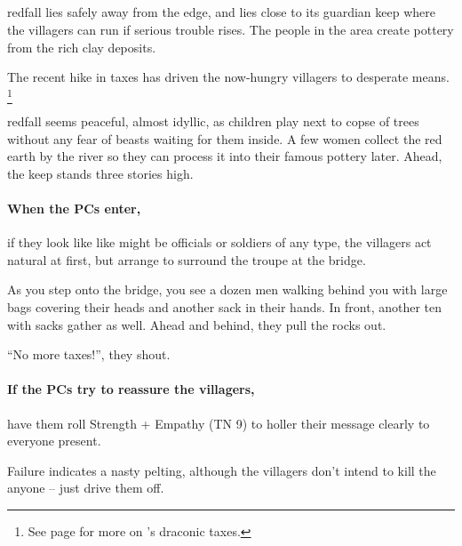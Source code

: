 
\subsection{}
\label{redfallVillage}

\Gls{redfall} lies safely away from the \gls{edge}, and lies close to its guardian keep where the villagers can run if serious trouble rises.
The people in the area create pottery from the rich clay deposits.

The recent hike in taxes has driven the now-hungry villagers to desperate means.%
\footnote{See page \pageref{desperatemeasures} for more on 's draconic taxes.}

\begin{boxtext}
  \Gls{redfall} seems peaceful, almost idyllic, as children play next to copse of trees without any fear of beasts waiting for them inside.
  A few women collect the red earth by the river so they can process it into their famous pottery later.
  Ahead, the keep stands three stories high.
\end{boxtext}

\paragraph{When the PCs enter,}
if they look like like might be officials or soldiers of any type, the villagers act natural at first, but arrange to surround the troupe at the bridge.

\begin{boxtext}

  As you step onto the bridge, you see a dozen men walking behind you with large bags covering their heads and another sack in their hands.
  In front, another ten with sacks gather as well.
  Ahead and behind, they pull the rocks out.

  ``No more taxes!'', they shout.

\end{boxtext}

\paragraph{If the PCs try to reassure the villagers,}
have them roll Strength + Empathy (TN 9) to holler their message clearly to everyone present.

Failure indicates a nasty pelting, although the villagers don't intend to kill the anyone -- just drive them off.

